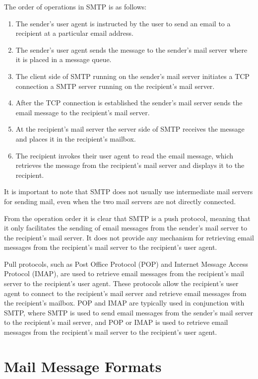 \documentclass[12pt letter]{report}
\begin{document}
The order of operations in SMTP is as follows:
\begin{enumerate}
  \item The sender's user agent is instructed by the user to send an
    email to a recipient at a particular email address.
  \item The sender's user agent sends the message to the sender's
    mail server where it is placed in a message queue.
  \item The client side of SMTP running on the sender's mail server
    initiates a TCP connection a SMTP server running on the
    recipient's mail server.
  \item After the TCP connection is established the sender's mail
    server sends the email message to the recipient's mail server.
  \item At the recipient's mail server the server side of SMTP
    receives the message and places it in the recipient's mailbox.
  \item The recipient invokes their user agent to read the email
    message, which retrieves the message from the recipient's mail
    server and displays it to the
    recipient.
\end{enumerate}

It is important to note that SMTP does not usually use intermediate
mail servers for sending mail, even when the two mail servers are not
directly connected.

From the operation order it is clear that SMTP is a push protocol,
meaning that it only facilitates the sending of email messages from
the sender's mail server to the recipient's mail server. It does not
provide any mechanism for retrieving email messages from the
recipient's mail server to the recipient's user agent.

Pull protocols, such as Post Office Protocol (POP) and Internet
Message Access Protocol (IMAP), are used to retrieve email messages from the
recipient's mail server to the recipient's user agent. These
protocols allow the recipient's user
agent to connect to the recipient's mail server and retrieve email
messages from the recipient's mailbox. POP and IMAP are typically
used in conjunction with SMTP, where SMTP is used to send email
messages from the sender's mail server to the recipient's mail
server, and POP or IMAP is used to retrieve email messages from the
recipient's mail server to the recipient's user agent.

\section{Mail Message Formats}
\end{document}
